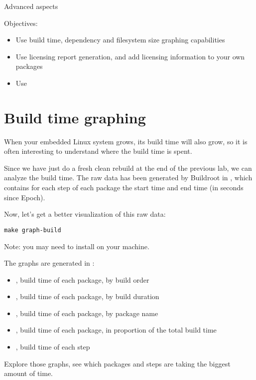 \subchapter
{Advanced aspects}
{Objectives:
  \begin{itemize}
  \item Use build time, dependency and filesystem size graphing capabilities
  \item Use licensing report generation, and add licensing
    information to your own packages
  \item Use 
  \end{itemize}
}

\section{Build time graphing}

When your embedded Linux system grows, its build time will also grow,
so it is often interesting to understand where the build time is
spent.

Since we have just do a fresh clean rebuild at the end of the previous
lab, we can analyze the build time. The raw data has been generated by
Buildroot in , which contains for
each step of each package the start time and end time (in seconds
since Epoch).

Now, let's get a better visualization of this raw data:

\begin{verbatim}
make graph-build
\end{verbatim}

Note: you may need to install  on your machine.

The graphs are generated in :

\begin{itemize}
\item {}, build time of each package, by
  build order
\item {}, build time of each package, by
  build duration
\item {}, build time of each package, by
  package name
\item {}, build time of each package, in
  proportion of the total build time
\item {}, build time of each step
\end{itemize}

Explore those graphs, see which packages and steps are taking the
biggest amount of time.

